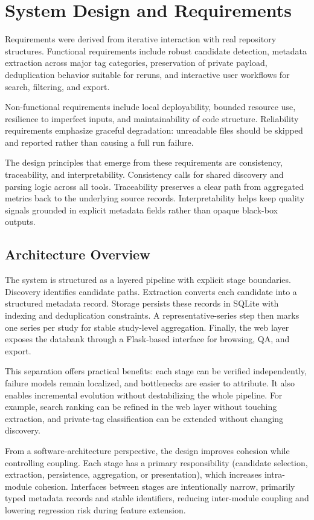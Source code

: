 \chapter{System Design and Requirements}

Requirements were derived from iterative interaction with real repository structures. Functional requirements include robust candidate detection, metadata extraction across major tag categories, preservation of private payload, deduplication behavior suitable for reruns, and interactive user workflows for search, filtering, and export.

Non-functional requirements include local deployability, bounded resource use, resilience to imperfect inputs, and maintainability of code structure. Reliability requirements emphasize graceful degradation: unreadable files should be skipped and reported rather than causing a full run failure.

The design principles that emerge from these requirements are consistency, traceability, and interpretability. Consistency calls for shared discovery and parsing logic across all tools. Traceability preserves a clear path from aggregated metrics back to the underlying source records. Interpretability helps keep quality signals grounded in explicit metadata fields rather than opaque black-box outputs.

\section{Architecture Overview}

The system is structured as a layered pipeline with explicit stage boundaries. Discovery identifies candidate paths. Extraction converts each candidate into a structured metadata record. Storage persists these records in SQLite with indexing and deduplication constraints. A representative-series step then marks one series per study for stable study-level aggregation. Finally, the web layer exposes the databank through a Flask-based interface for browsing, QA, and export.

This separation offers practical benefits: each stage can be verified independently, failure models remain localized, and bottlenecks are easier to attribute. It also enables incremental evolution without destabilizing the whole pipeline. For example, search ranking can be refined in the web layer without touching extraction, and private-tag classification can be extended without changing discovery.

From a software-architecture perspective, the design improves cohesion while controlling coupling. Each stage has a primary responsibility (candidate selection, extraction, persistence, aggregation, or presentation), which increases intra-module cohesion. Interfaces between stages are intentionally narrow, primarily typed metadata records and stable identifiers, reducing inter-module coupling and lowering regression risk during feature extension.

